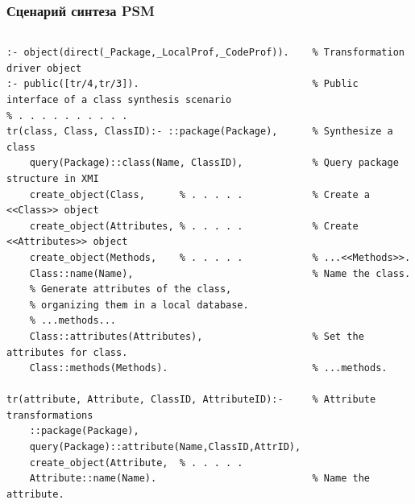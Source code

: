 \documentclass[handout]{beamer}
\begin{document}
\begin{frame}[fragile]
  \frametitle{Сценарий синтеза PSM}

  \begin{columns}
    \begin{column}{0.6\textwidth}
\begin{verbatim}
:- object(direct(_Package,_LocalProf,_CodeProf)).    % Transformation driver object
:- public([tr/4,tr/3]).                              % Public interface of a class synthesis scenario
% . . . . . . . . . .
tr(class, Class, ClassID):- ::package(Package),      % Synthesize a class
    query(Package)::class(Name, ClassID),            % Query package structure in XMI
    create_object(Class,      % . . . . .            % Create a <<Class>> object
    create_object(Attributes, % . . . . .            % Create <<Attributes>> object
    create_object(Methods,    % . . . . .            % ...<<Methods>>.
    Class::name(Name),                               % Name the class.
    % Generate attributes of the class,
    % organizing them in a local database.
    % ...methods...
    Class::attributes(Attributes),                   % Set the attributes for class.
    Class::methods(Methods).                         % ...methods.

tr(attribute, Attribute, ClassID, AttributeID):-     % Attribute transformations
    ::package(Package),
    query(Package)::attribute(Name,ClassID,AttrID),
    create_object(Attribute,  % . . . . .
    Attribute::name(Name).                           % Name the attribute.


\end{verbatim}
\end{column}
\end{columns}
\end{frame}
\end{document}

